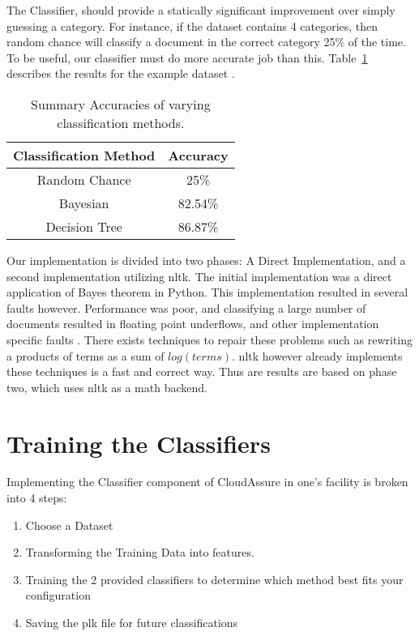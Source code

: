 The Classifier, should provide a statically significant improvement over simply
guessing a category. For instance, if the dataset contains 4 categories, then
random chance will classify a document in the correct category 25\% of the time.
To be useful, our classifier must do more accurate job than this.
Table~\ref{tab:classification_accuracy} describes the results for the example
dataset \autocite{University}.

\begin{table}[h!]
    \centering
    \begin{tabular}{c | c }
        \hline
        Classification Method & Accuracy \\
        \hline \hline
        Random Chance & 25\%\\
        Bayesian & 82.54\% \\
        Decision Tree & 86.87\% \\
    \end{tabular}
    \caption{Summary Accuracies of varying classification methods.}
    \label{tab:classification_accuracy}
\end{table}

Our implementation is divided into two phases: A Direct Implementation, and
a second implementation utilizing \gls{nltk}. The initial implementation was
a direct application of Bayes theorem in Python. This implementation resulted in
several faults however. Performance was poor, and classifying a large number of
documents resulted in floating point underflows, and other implementation
specific faults \autocite{Graham-Cummings2005}. There exists techniques to repair these problems such as
rewriting a products  of terms as a sum of \(log(terms) \). \gls{nltk} however
already implements these techniques is a fast and correct way. Thus are results
are based on phase two, which uses \gls{nltk} as a math backend.\autocite{Denoyer2004}

\section{Training the Classifiers}
Implementing the Classifier component of CloudAssure in one's facility is broken
into 4 steps:
\begin{enumerate}
    \item Choose a Dataset
    \item Transforming the Training Data into features.
    \item Training the 2 provided classifiers to determine which method best
        fits your configuration
    \item Saving the plk file for future classifications
\end{enumerate}

